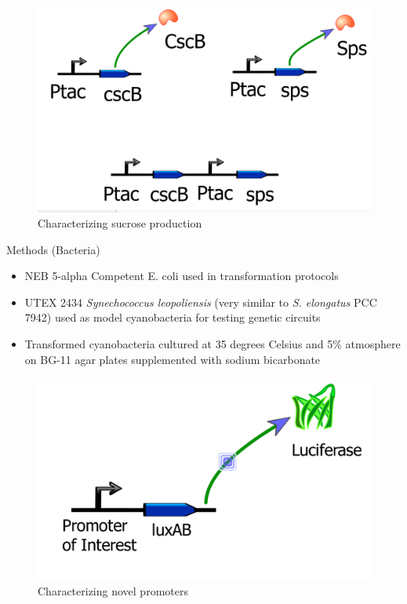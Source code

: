 \documentclass[final]{beamer}
\newlength{\onecolwid}
\newlength{\twocolwid}
\begin{document}
\begin{frame}[t]
\begin{columns}[t]
\begin{column}{\twocolwid}
\begin{columns}[t,totalwidth=\twocolwid]
\begin{column}{\onecolwid}
\begin{figure}
\includegraphics[width=0.8\linewidth]{Q1.PNG}
\caption{Characterizing sucrose production}
\end{figure}

\begin{block}{Methods (Bacteria)}

\begin{itemize}
\item NEB 5-alpha Competent E. coli used in transformation protocols
\item UTEX 2434 \textit{Synechococcus leopoliensis} (very similar to \textit{S. elongatus} PCC 7942) used as model cyanobacteria for testing genetic circuits
\item Transformed cyanobacteria cultured at 35 degrees Celsius and 5\%  atmosphere on BG-11 agar plates supplemented with sodium bicarbonate
\end{itemize}

\begin{figure}
\includegraphics[width=0.8\linewidth]{Q2.PNG}
\caption{Characterizing novel promoters}
\end{figure}


\end{block}
\end{column}
\end{columns}
\end{column}
\end{columns}
\end{frame}
\end{document}
